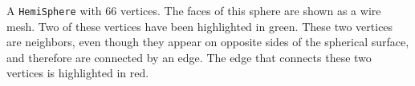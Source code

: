 \label{fig:hemiSphere} A \verb|HemiSphere| with 66 vertices. The faces of this sphere are shown as a wire mesh. Two of these vertices have been highlighted in green. These two vertices are neighbors, even though they appear on opposite sides of the spherical surface, and therefore are connected by an edge. The edge that connects these two vertices is highlighted in red.